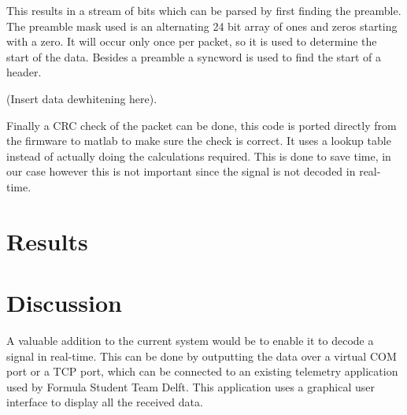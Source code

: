\documentclass{IEEEtran}
\begin{document}
This results in a stream of bits which can be parsed by first finding the preamble. The preamble mask used is an alternating 24 bit array of ones and zeros starting with a zero. It will occur only once per packet, so it is used to determine the start of the data. Besides a preamble a syncword is used to find the start of a header. 

(Insert data dewhitening here).

Finally a CRC check of the packet can be done, this code is ported directly from the firmware to matlab to make sure the check is correct. It uses a lookup table instead of actually doing the calculations required. This is done to save time, in our case however this is not important since the signal is not decoded in real-time.

\section{Results}



\section{Discussion}

A valuable addition to the current system would be to enable it to decode a signal in real-time. This can be done by outputting the data over a virtual COM port or a TCP port, which can be connected to an existing telemetry application used by Formula Student Team Delft. This application uses a graphical user interface to display all the received data.
\printbibliography
\end{document}
